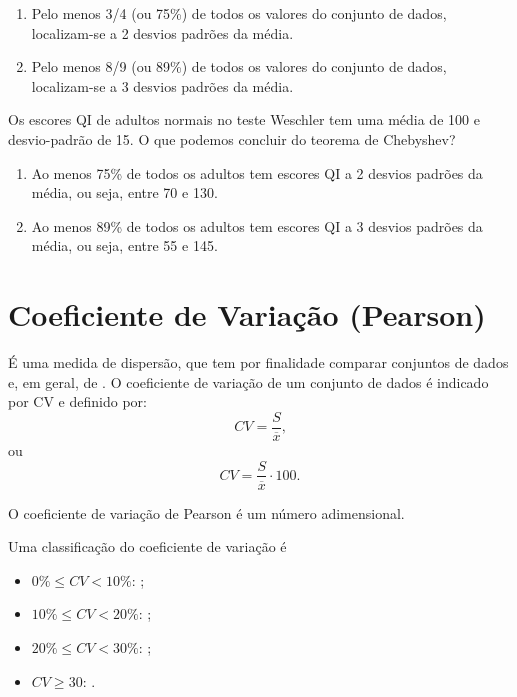 \documentclass[11pt,fleqn]{book}
\numberwithin{mpicture}{chapter}
\numberwithin{mtable}{chapter}
\numberwithin{mframe}{chapter}
\begin{document}
\begin{enumerate}
	\item Pelo menos 3/4 (ou 75\%) de todos os valores do conjunto de dados, localizam-se a 2 desvios padrões da média.
	
	\item Pelo menos 8/9 (ou 89\%) de todos os valores do conjunto de dados, localizam-se a 3 desvios padrões da média.
\end{enumerate}

\begin{example}
	Os escores QI de adultos normais no teste Weschler tem uma média de 100 e desvio-padrão de 15. O que podemos concluir do teorema de Chebyshev?
	
	\begin{enumerate}
		\item Ao menos 75\% de todos os adultos tem escores QI a 2 desvios padrões da média, ou seja, entre 70 e 130.
		
		\item Ao menos 89\% de todos os adultos tem escores QI a 3 desvios padrões da média, ou seja, entre 55 e 145.
	\end{enumerate}
\end{example}

\section{Coeficiente de Variação (Pearson)}

É uma medida de dispersão, que tem por finalidade comparar conjuntos de dados  e, em geral, de . O coeficiente de variação de um conjunto de dados é indicado por CV e definido por:
\begin{equation}
	CV=\frac{S}{\overline{x}}\text{,}
\end{equation}
ou
\begin{equation}
	CV=\frac{S}{\overline{x}}\cdot 100\text{.}
\end{equation}

O coeficiente de variação de Pearson é um número adimensional.

Uma classificação do coeficiente de variação é
\begin{itemize}
	\item $0\%\leqslant CV < 10\%$: ;
	\item $10\%\leqslant CV < 20\%$: ;
	\item $20\%\leqslant CV < 30\%$: ;
	\item $CV \geqslant 30$: .
\end{itemize}
\end{document}
